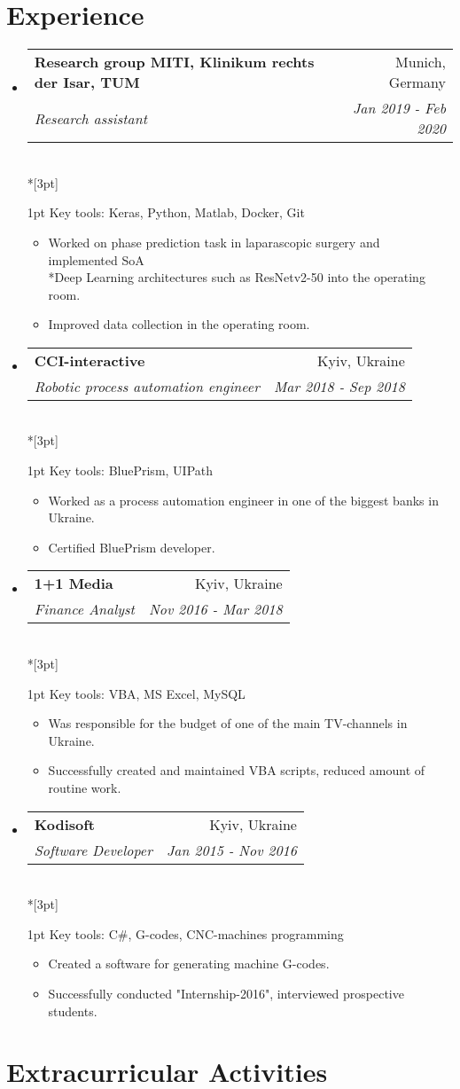 \documentclass[11pt]{article}
\makeatletter
\newcommand{\jobDescription}[5]{  %
  \vspace{-5pt}
  \item
    \begin{tabular*}{0.99\textwidth}{l@{\extracolsep{\fill}}r}
      \textbf{#1} & #2 \\
      \textit{\small #3} & \textit{\small #4} \\
    \end{tabular*}
    \\*[3pt]
    \begin{adjustwidth}{1pt}{}
    #5\vspace{-7pt}
    \end{adjustwidth}
}
\newcommand{\jobAchievement}[1]{
  \item\small{
    {#1 \vspace{-2pt}}
  }
}
\makeatother
\begin{document}
\section{Experience}
  \begin{itemize}[label={}]
  	\vspace{5pt}
  	\jobDescription
  	{Research group MITI, Klinikum rechts der Isar, TUM}{Munich, Germany}
  	{Research assistant}{Jan 2019 - Feb 2020}
  	{Key tools: Keras, Python, Matlab, Docker, Git}
      \begin{itemize}
        \jobAchievement{Worked on phase prediction task in laparascopic surgery and implemented SoA \\*Deep Learning 
        	architectures such as ResNetv2-50 into the operating room.}
        \jobAchievement{Improved data collection in the operating room.}
    \end{itemize}
    \jobDescription
      {CCI-interactive}{Kyiv, Ukraine}
      {Robotic process automation engineer}{Mar 2018 - Sep 2018}
      {Key tools: BluePrism, UIPath}
      \begin{itemize}
        \jobAchievement{Worked as a process automation engineer in one of the biggest banks in Ukraine.}
        \jobAchievement{Certified BluePrism developer.}
    \end{itemize}
    \jobDescription
      {1+1 Media}{Kyiv, Ukraine}
      {Finance Analyst}{Nov 2016 - Mar 2018}
      {Key tools: VBA, MS Excel, MySQL}
      \begin{itemize}
        \jobAchievement{Was responsible for the budget of one of the main TV-channels in Ukraine.}
        \jobAchievement{Successfully created and maintained VBA scripts, reduced amount of routine work.}
    \end{itemize}
    \jobDescription
      {Kodisoft}{Kyiv, Ukraine}
      {Software Developer}{Jan 2015 - Nov 2016}
      {Key tools: C\#, G-codes, CNC-machines programming}
      \begin{itemize}
        \jobAchievement{Created a software for generating machine G-codes.}
        \jobAchievement{Successfully conducted "Internship-2016", interviewed prospective students.}
    \end{itemize}
  \end{itemize}

\section{Extracurricular Activities}
\end{document}
